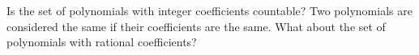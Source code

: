   Is the set of polynomials with integer coefficients countable?
  Two polynomials are considered the same if their coefficients are the same.
  What about the set of polynomials with rational coefficients?
